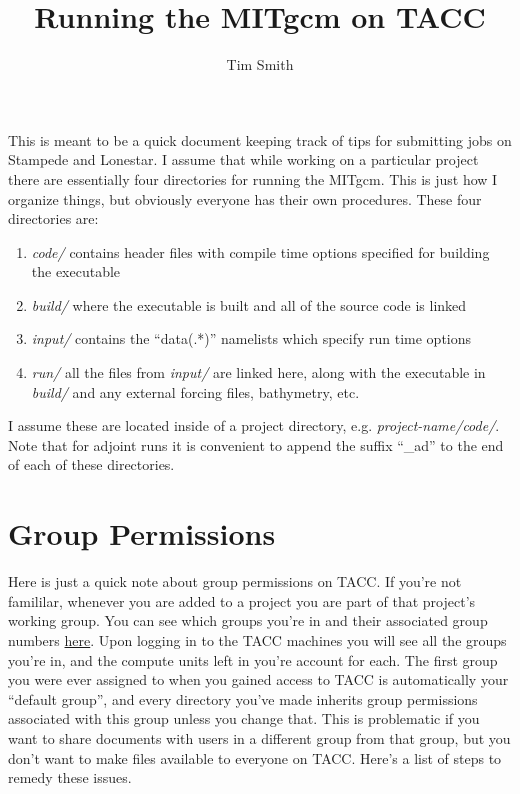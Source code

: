 \documentclass[a4paper,11pt]{article}
\title{\vspace{-10ex}Running the MITgcm on TACC}
\author{Tim Smith}
\date{\vspace{-3ex}}
\begin{document}
\maketitle

	This is meant to be a quick document keeping track of tips for submitting jobs on Stampede and Lonestar. I assume that while working on a particular project there are essentially four directories for running the MITgcm. This is just how I organize things, but obviously everyone has their own procedures. These four directories are: 

	\begin{enumerate}
	  \item \textit{code/} contains header files with compile time options specified for building the executable
	  \item \textit{build/} where the executable is built and all of the source code is linked
	  \item \textit{input/} contains the ``data(.*)'' namelists which specify run time options
	  \item \textit{run/} all the files from \textit{input/} are linked here, along with the executable in \textit{build/} and any external forcing files, bathymetry, etc. 
	\end{enumerate} 

	I assume these are located inside of a project directory, e.g. \textit{ project-name/code/}. Note that for adjoint runs it is convenient to append the suffix ``\_ad'' to the end of each of these directories. 

\section{Group Permissions}
\label{groups}

	Here is just a quick note about group permissions on TACC. If you're not famililar, whenever you are added to a project you are part of that project's working group. You can see which groups you're in and their associated group numbers \href{https://portal.tacc.utexas.edu/projects-and-allocations}{here}. Upon logging in to the TACC machines you will see all the groups you're in, and the compute units left in you're account for each. The first group you were ever assigned to when you gained access to TACC is automatically your ``default group'', and every directory you've made inherits group permissions associated with this group unless you change that. This is problematic if you want to share documents with users in a different group from that group, but you don't want to make files available to everyone on TACC. Here's a list of steps to remedy these issues.
\end{document}
